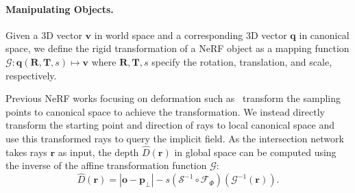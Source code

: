 \documentclass[letterpaper]{article} %
\begin{document}
\paragraph{Manipulating Objects.} Given a 3D vector $\mathbf{v}$ in world space and a corresponding 3D vector $\mathbf{q}$ in canonical space, we define the rigid transformation of a NeRF object as
 a mapping function $\mathcal{G}: \mathbf{q}(\mathbf{R}, \mathbf{T}, s) \mapsto \mathbf{v} $ where $\mathbf{R}, \mathbf{T}, s$ specify the rotation, translation, and scale, respectively.

Previous NeRF works focusing on deformation such as~\cite{Pumarola_2021_CVPR, park2021nerfies, park2021hypernerf, ost2021neural} transform the sampling points to canonical space to achieve the transformation. We instead directly transform the starting point and direction of rays to local canonical space and use this transformed rays to query the implicit field.
As the intersection network takes rays $\mathbf{r}$ as input, the depth $\hat{D}(\mathbf{r})$ in global space can be computed using the inverse of the affine transformation function $\mathcal{G}$:
\begin{equation}
    \hat{D}(\mathbf{r}) = |\mathbf{o}-\mathbf{p}_{\perp}|- s\left(\mathcal{S}^{-1} \circ \mathcal{F}_{\Phi}\right) \left(\mathcal{G}^{-1}(\mathbf{r})\right).
\end{equation}
\end{document}
